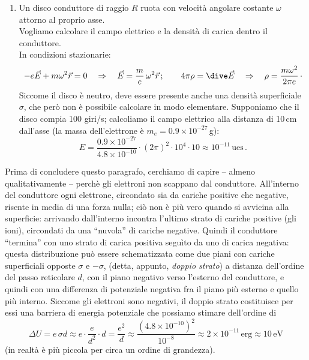 \begin{enumerate}
    la sua media \`e nulla ed inoltre, a causa del fattore esponenziale, a
    distanza di pochi passi reticolari si \`e gi\`a ridotto praticamente a zero.
  \item Un disco conduttore di raggio $R$ ruota con velocit\`a angolare costante
    $\omega$ attorno al proprio asse.\\
    Vogliamo calcolare il campo elettrico e la densit\`a di carica dentro il
    conduttore.\\
    In condizioni stazionarie:
    \[
      -e\vec E+m\omega^2\vec r=0\quad\Rightarrow
      \quad\vec E=\frac me\,\omega^2\vec r\,;\qquad4\pi\rho=\dive\vec E
      \quad\Rightarrow\quad\rho=\frac{m\omega^2}{2\pi e}\,\cdot
    \]
    Siccome il disco \`e neutro, deve essere presente anche una densit\`a
    superficiale $\sigma$, che per\`o non \`e possibile calcolare in modo
    elementare. Supponiamo che il disco compia 100 giri/s; calcoliamo il campo
    elettrico alla distanza di 10\,cm dall'asse (la massa dell'elettrone \`e
    $m_e=0.9\times10^{-27}$\,g):
    \[
      E=\frac{0.9\times10^{-27}}{4.8\times10^{-10}}\cdot(2\pi)^2\cdot10^4\cdot10
      \approx10^{-11}\,\mathrm{ues}\,.
    \]
\end{enumerate}
Prima di concludere questo paragrafo, cerchiamo di capire -- almeno
qualitativamente -- perch\`e gli elettroni non scappano dal conduttore.
All'interno del conduttore ogni elettrone, circondato sia da cariche positive
che negative, risente in media di una forza nulla; ci\`o non \`e pi\`u vero
quando si avvicina alla superficie: arrivando dall'interno incontra l'ultimo
strato di cariche positive (gli ioni), circondati da una ``nuvola'' di cariche
negative. Quindi il conduttore ``termina'' con uno strato di carica positiva
segu\`ito da uno di carica negativa: questa distribuzione pu\`o essere
schematizzata come
due piani con cariche superficiali opposte $\sigma$ e $-\sigma$, (detta,
appunto, \emph{doppio strato}) a distanza dell'ordine del passo reticolare $d$,
con il piano negativo verso l'esterno del conduttore, e quindi con una
differenza di potenziale negativa fra il piano pi\`u esterno e quello pi\`u
interno. Siccome gli elettroni sono negativi, il doppio strato costituisce per
essi una barriera di energia potenziale che possiamo stimare dell'ordine di
\[
  \Delta U=e\,\sigma d\approx e\cdot\frac{e}{d^2}\cdot d
  =\frac{e^2}{d}\approx\frac{(4.8\times10^{-10})^2}{10^{-8}}
  \approx2\times10^{-11}\,\mathrm{erg}\approx10\,\mathrm{eV}
\]
(in realt\`a \`e pi\`u piccola per circa un ordine di grandezza).\\
